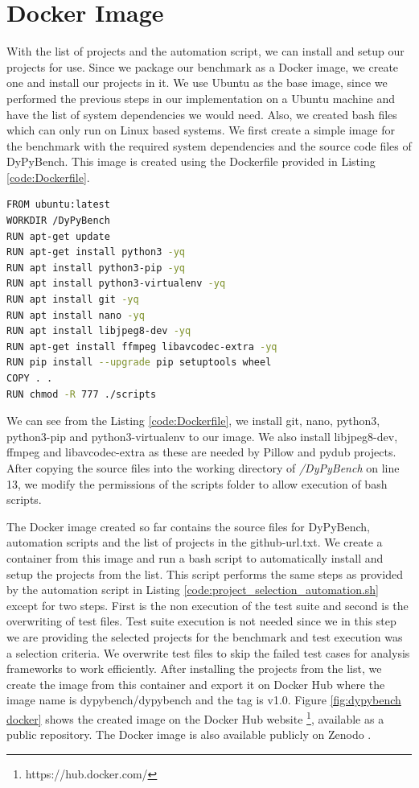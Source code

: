 \section{Docker Image}
\label{impl:Docker Image}
With the list of projects and the automation script, we can install and setup our projects for use.
Since we package our benchmark as a Docker image, we create one and install our projects in it.
We use Ubuntu as the base image, since we performed the previous steps in our implementation on a Ubuntu machine and have the list of system dependencies we would need.
Also, we created bash files which can only run on Linux based systems.
We first create a simple image for the benchmark with the required system dependencies and the source code files of DyPyBench.
This image is created using the Dockerfile provided in Listing \ref{code:Dockerfile}.
\begin{lstlisting}[caption=Dockerfile.,label=code:Dockerfile,language=Bash]
FROM ubuntu:latest
WORKDIR /DyPyBench
RUN apt-get update
RUN apt-get install python3 -yq
RUN apt install python3-pip -yq
RUN apt install python3-virtualenv -yq
RUN apt install git -yq
RUN apt install nano -yq
RUN apt install libjpeg8-dev -yq
RUN apt-get install ffmpeg libavcodec-extra -yq
RUN pip install --upgrade pip setuptools wheel
COPY . .
RUN chmod -R 777 ./scripts 
\end{lstlisting}

We can see from the Listing \ref{code:Dockerfile}, we install git, nano, python3, python3-pip and python3-virtualenv to our image.
We also install libjpeg8-dev, ffmpeg and libavcodec-extra as these are needed by Pillow and pydub projects.
After copying the source files into the working directory of \textit{/DyPyBench} on line 13, we modify the permissions of the scripts folder to allow execution of bash scripts.

The Docker image created so far contains the source files for DyPyBench, automation scripts and the list of projects in the github-url.txt.
We create a container from this image and run a bash script to automatically install and setup the projects from the list.
This script performs the same steps as provided by the automation script in Listing \ref{code:project_selection_automation.sh} except for two steps.
First is the non execution of the test suite and second is the overwriting of test files.
Test suite execution is not needed since we in this step we are providing the selected projects for the benchmark and test execution was a selection criteria.
We overwrite test files to skip the failed test cases for analysis frameworks to work efficiently. 
After installing the projects from the list, we create the image from this container and export it on Docker Hub where the image name is dypybench/dypybench and the tag is v1.0.
Figure \ref{fig:dypybench docker} shows the created image on the Docker Hub website \footnote{https://hub.docker.com/}, available as a public repository.
The Docker image is also available publicly on Zenodo \cite{bajaj_piyush_2023_7886366}.

